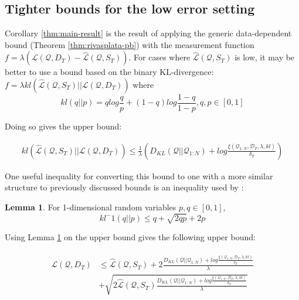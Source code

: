 \documentclass{article}
\theoremstyle{definition}
\newtheorem{lemma}{Lemma}[section]
\begin{document}
\subsection{Tighter bounds for the low error setting}

Corollary \ref{thm:main-result} is the result of applying the generic data-dependent bound (Theorem \ref{thm:rivasplata-pb}) with the measurement function $f=\lambda(\mathcal{L}(\mathcal{Q},D_T)-\hat{\mathcal{L}}(\mathcal{Q}, S_T))$. For cases where $\hat{\mathcal{L}}(\mathcal{Q}, S_T)$ is low, it may be better to use a bound based on the binary KL-divergence: $f=\lambda kl(\hat{\mathcal{L}}(\mathcal{Q}, S_T)||\mathcal{L}(\mathcal{Q},D_T))$
where $$kl(q||p)=q log\frac{q}{p}+(1-q)log\frac{1-q}{1-p}, q,p\in[0, 1]$$

Doing so gives the upper bound:

\begin{align} \label{eq:generic-kl-bound}
kl(\hat{\mathcal{L}}(\mathcal{Q}, S_T)||\mathcal{L}(\mathcal{Q},D_T)) \leq \frac{1}{\lambda}\left (D_{KL}(\mathcal{Q}||\mathcal{Q}_{1:N})+log\frac{\xi(\mathcal{Q}_{1:N}, \mathcal{D}_T,\lambda, kl)}{\delta_T} \right )
\end{align}

One useful inequality for converting this bound to one with a more similar structure to previously discussed bounds is an inequality used by \citet{Tolstikhin2013}:

\begin{lemma} \citep{Tolstikhin2013} \label{thm:kl-inverse}
	For 1-dimensional random variables $p,q \in [0, 1]$,
	$$kl^-1(q||p)\leq q + \sqrt{2qp}+2p$$
\end{lemma}

Using Lemma \ref{thm:kl-inverse} on the upper bound gives the following upper bound:

\begin{align} \label{eq:tolstikhin-kl-bound}
\begin{split}
\mathcal{L}(\mathcal{Q},D_T) &\leq \hat{\mathcal{L}}(\mathcal{Q}, S_T) + 2\frac{D_{KL}(\mathcal{Q}||\mathcal{Q}_{1:N})+log\frac{\xi(\mathcal{Q}_{1:N}, \mathcal{D}_T,\lambda, kl)}{\delta_T}}{\lambda}\\
&+\sqrt{2\hat{\mathcal{L}}(\mathcal{Q}, S_T)\frac{D_{KL}(\mathcal{Q}||\mathcal{Q}_{1:N})+log\frac{\xi(\mathcal{Q}_{1:N}, \mathcal{D}_T,\lambda, kl)}{\delta_T}}{\lambda}}
\end{split}
\end{align}
\end{document}
